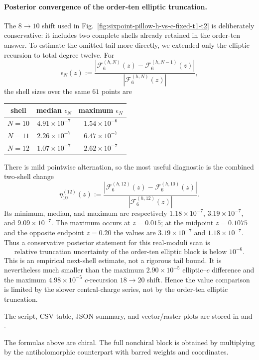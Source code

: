 \documentclass[11pt]{article}
\newcommand{\cF}{\mathcal F}
\begin{document}
\paragraph{Posterior convergence of the order-ten elliptic truncation.}
The $8\to10$ shift used in Fig.~\ref{fig:sixpoint-pillow-h-vs-c-fixed-t1-t2}
is deliberately conservative: it includes two complete shells already
retained in the order-ten answer.  To estimate the omitted tail more
directly, we extended only the elliptic recursion to total degree twelve.
For
\begin{equation}
 \epsilon_N(z):=
 \frac{|\cF_6^{(h,N)}(z)-\cF_6^{(h,N-1)}(z)|}
 {|\cF_6^{(h,N)}(z)|},
 \label{eq:sixpoint-shell-size}
\end{equation}
the shell sizes over the same $61$ points are
\begin{center}
\begin{tabular}{c|c|c}
shell & median $\epsilon_N$ & maximum $\epsilon_N$\\
\hline
$N=10$ & $4.91\times10^{-7}$ & $1.54\times10^{-6}$\\
$N=11$ & $2.26\times10^{-7}$ & $6.47\times10^{-7}$\\
$N=12$ & $1.07\times10^{-7}$ & $2.62\times10^{-7}$
\end{tabular}
\end{center}
There is mild pointwise alternation, so the most useful diagnostic is the
combined two-shell change
\begin{equation}
 \eta_{10}^{(12)}(z):=
 \frac{|\cF_6^{(h,12)}(z)-\cF_6^{(h,10)}(z)|}
 {|\cF_6^{(h,12)}(z)|}.
 \label{eq:sixpoint-order-ten-posterior}
\end{equation}
Its minimum, median, and maximum are respectively
$1.18\times10^{-7}$, $3.19\times10^{-7}$, and
$9.09\times10^{-7}$.  The maximum occurs at $z=0.015$; at the midpoint
$z=0.1075$ and the opposite endpoint $z=0.20$ the values are
$3.19\times10^{-7}$ and $1.18\times10^{-7}$.  Thus a conservative
posterior statement for this real-moduli scan is
\begin{equation}
 \boxed{\text{relative truncation uncertainty of the order-ten elliptic
 block is below }10^{-6}.}
 \label{eq:sixpoint-order-ten-convergence}
\end{equation}
This is an empirical next-shell estimate, not a rigorous tail bound.  It is
nevertheless much smaller than the maximum $2.90\times10^{-5}$ elliptic--$c$
difference and the maximum $4.98\times10^{-5}$ $c$-recursion
$18\to20$ shift.  Hence the value comparison is limited by the slower
central-charge series, not by the order-ten elliptic truncation.

The script, CSV table, JSON summary, and vector/raster plots are stored in
 and
.

The formulas above are chiral.  The full nonchiral block is obtained by
multiplying by the antiholomorphic counterpart with barred weights and
coordinates.
\end{document}

